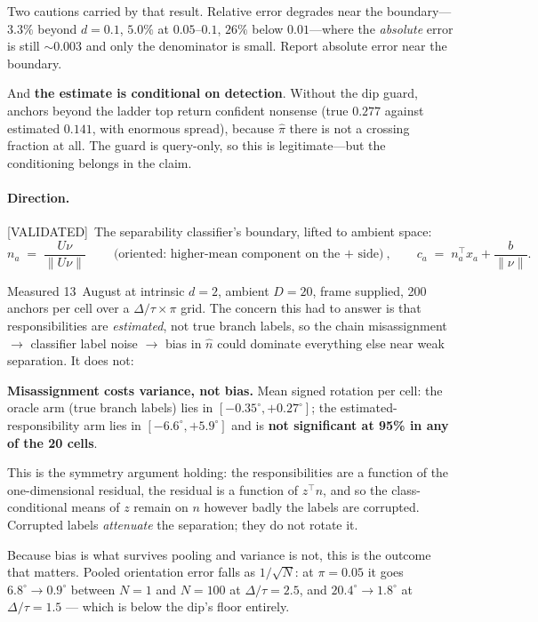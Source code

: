 \documentclass[11pt]{article}
\newcommand{\pihat}{\hat{\pi}}
\newcommand{\nhat}{\hat{n}}
\newcommand{\provtag}[2]{{\footnotesize\sffamily\textcolor{#1}{[#2]}}}
\newcommand{\VALID}{\provtag{okgreen}{VALIDATED}}
\begin{document}
Two cautions carried by that result. Relative error degrades near the boundary---$3.3\%$ beyond
$d = 0.1$, $5.0\%$ at $0.05$--$0.1$, $26\%$ below $0.01$---where the \emph{absolute} error is
still $\sim\!0.003$ and only the denominator is small. Report absolute error near the boundary.

And \textbf{the estimate is conditional on detection}. Without the dip guard, anchors beyond the
ladder top return confident nonsense (true $0.277$ against estimated $0.141$, with enormous
spread), because $\pihat$ there is not a crossing fraction at all. The guard is query-only, so
this is legitimate---but the conditioning belongs in the claim.

\paragraph{Direction.} \VALID\ The separability classifier's boundary, lifted to ambient space:
\[
  n_a \;=\; \frac{U\nu}{\lVert U\nu \rVert}
  \qquad\text{(oriented: higher-mean component on the $+$ side)},
  \qquad
  c_a \;=\; n_a^\top x_a + \frac{b}{\lVert\nu\rVert}.
\]

Measured 13~August at intrinsic $d = 2$, ambient $D = 20$, frame supplied, 200 anchors per
cell over a $\Delta/\tau \times \pi$ grid. The concern this had to answer is that
responsibilities are \emph{estimated}, not true branch labels, so the chain
misassignment $\to$ classifier label noise $\to$ bias in $\nhat$ could dominate everything
else near weak separation. It does not:

\begin{resultbox}
\noindent\textbf{\sffamily Misassignment costs variance, not bias.} Mean signed rotation per
cell: the oracle arm (true branch labels) lies in $[-0.35^\circ, +0.27^\circ]$; the
estimated-responsibility arm lies in $[-6.6^\circ, +5.9^\circ]$ and is \textbf{not
significant at 95\% in any of the 20 cells}.

\smallskip
\noindent This is the symmetry argument holding: the responsibilities are a function of the
one-dimensional residual, the residual is a function of $z^\top n$, and so the
class-conditional means of $z$ remain on $n$ however badly the labels are corrupted.
Corrupted labels \emph{attenuate} the separation; they do not rotate it.
\end{resultbox}

\noindent Because bias is what survives pooling and variance is not, this is the outcome
that matters. Pooled orientation error falls as $1/\sqrt{N}$: at $\pi = 0.05$ it goes
$6.8^\circ \to 0.9^\circ$ between $N = 1$ and $N = 100$ at $\Delta/\tau = 2.5$, and
$20.4^\circ \to 1.8^\circ$ at $\Delta/\tau = 1.5$ --- which is below the dip's floor
entirely.
\end{document}
